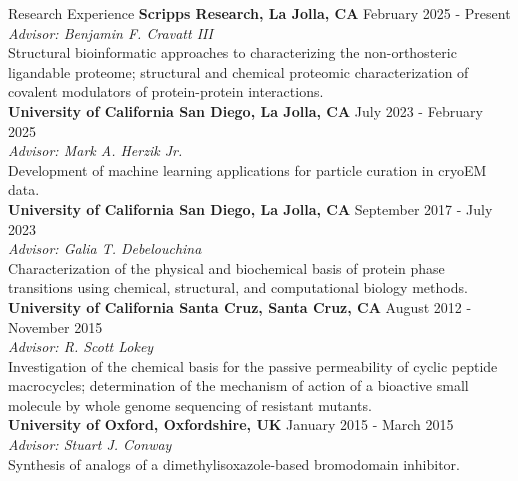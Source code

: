 \documentclass{cv}
\begin{document}

\begin{rSection}{Research Experience}
{\bf Scripps Research, La Jolla, CA} \hfill    February 2025 - Present 
\\ {\em Advisor: Benjamin F. Cravatt III}
\\ Structural bioinformatic approaches to characterizing the non-orthosteric ligandable proteome; structural and chemical proteomic characterization of covalent modulators of protein-protein interactions.\\

{\bf University of California San Diego, La Jolla, CA} \hfill    July 2023 - February 2025 
\\ {\em Advisor: Mark A. Herzik Jr.}
\\ Development of machine learning applications for particle curation in cryoEM data.\\

{\bf University of California San Diego, La Jolla, CA} \hfill    September 2017 - July 2023 
\\ {\em Advisor: Galia T. Debelouchina}
\\ Characterization of the physical and biochemical basis of protein phase transitions using chemical, structural, and computational biology methods.\\

{\bf University of California Santa Cruz, Santa Cruz, CA} \hfill    August 2012 - November 2015 
\\ {\em Advisor: R. Scott Lokey}
\\ Investigation of the chemical basis for the passive permeability of cyclic peptide macrocycles; determination of the mechanism of action of a bioactive small molecule by whole genome sequencing of resistant mutants.\\

{\bf University of Oxford, Oxfordshire, UK} \hfill    January 2015 - March 2015 
\\ {\em Advisor: Stuart J. Conway}
\\ Synthesis of analogs of a dimethylisoxazole-based bromodomain inhibitor.\\

\end{rSection}

\end{document}
